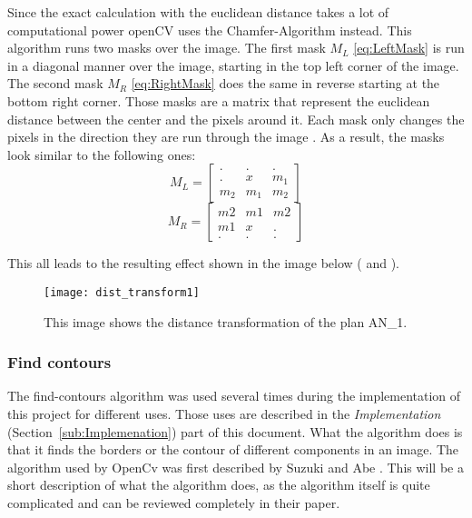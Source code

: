 Since the exact calculation with the euclidean distance takes a lot of computational power openCV uses the Chamfer-Algorithm instead. This algorithm runs two masks over the image. The first mask $M_{L}$ \eqref{eq:LeftMask} is run in a diagonal manner over the image, starting in the top left corner of the image. The second mask $M_{R}$ \eqref{eq:RightMask} does the same in reverse starting at the bottom right corner. Those masks are a matrix that represent the euclidean distance between the center and the pixels around it. Each mask only changes the pixels in the direction they are run through the image \citep{burger_burge_2016}. As a result, the masks look similar to the following ones:
\begin{equation}\label{eq:LeftMask} M_{L} = \begin{bmatrix} . & . & .\\ . & x & m_1 \\ m_2 & m_1 & m_2 \end{bmatrix}\end{equation}
\begin{equation}\label{eq:RightMask}M_{R} = \begin{bmatrix} m2 & m1 & m2 \\ m1 & x & . \\ . & . & . \end{bmatrix} \end{equation}

This all leads to the resulting effect shown in the image below (\citep{szeliski_2011} and \citep{distancetransform}).
\begin{figure}[H]
	\centering
	\texttt{[image: dist\_transform1]}
	\caption{This image shows the distance transformation of the plan AN\_1.}
	\label{dist_transf_theory}
\end{figure}


\subsubsection{Find contours}
\label{sub:FindContoursTheory}
The find-contours algorithm was used several times during the implementation of this project for different uses. Those uses are described in the \textit{Implementation} (Section~\ref{sub:Implemenation}) part of this document. What the algorithm does is that it finds the borders or the contour of different components in an image. The algorithm used by OpenCv was first described by Suzuki and Abe \citep{suzuki_abe_1985}. This will be a short description of what the algorithm does, as the algorithm itself is quite complicated and can be reviewed completely in their paper.

